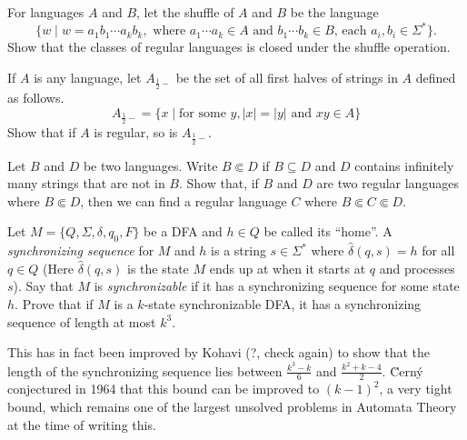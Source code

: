 \begin{exercise}
For languages $A$ and $B$, let the shuffle of $A$ and $B$ be the language
$$\{w\mid w=a_1b_1\cdots a_kb_k,\text{ where $a_1\cdots a_k\in A$ and $b_1\cdots b_k\in B$, each $a_i,b_i\in\Sigma^*$}\}.$$
Show that the classes of regular languages is closed under the shuffle operation.
\end{exercise}

\begin{exercise}
If $A$ is any language, let $A_{\frac 12-}$ be the set of all first halves of strings in $A$ defined as follows.
$$A_{\frac 12-}=\{x\mid \text{for some }y, |x|=|y|\text{ and }xy\in A\}$$
Show that if $A$ is regular, so is $A_{\frac 12-}$.
\end{exercise}

\begin{exercise}
Let $B$ and $D$ be two languages. Write $B\Subset D$ if $B\subseteq D$ and $D$ contains infinitely many strings that are not in $B$. Show that, if $B$ and $D$ are two regular languages where $B\Subset D$, then we can find a regular language $C$ where $B\Subset C\Subset D$.
\end{exercise}

\begin{exercise}
Let $M=\{Q,\Sigma,\delta,q_0,F\}$ be a DFA and $h\in Q$ be called its ``home''. A \textit{synchronizing sequence} for $M$ and $h$ is a string $s\in\Sigma^*$ where $\hat\delta(q,s)=h$ for all $q\in Q$ (Here $\hat\delta(q,s)$ is the state $M$ ends up at when it starts at $q$ and processes $s$). Say that $M$ is \textit{synchronizable} if it has a synchronizing sequence for some state $h$. Prove that if $M$ is a $k$-state synchronizable DFA, it has a synchronizing sequence of length at most $k^3$.

This has in fact been improved by Kohavi (?, check again) to show that the length of the synchronizing sequence lies between $\frac{k^3-k}{6}$ and $\frac{k^2+k-4}{2}$. \u{C}ern\'{y} conjectured in 1964 that this bound can be improved to $(k-1)^2$, a very tight bound, which remains one of the largest unsolved problems in Automata Theory at the time of writing this.
\end{exercise}
\clearpage